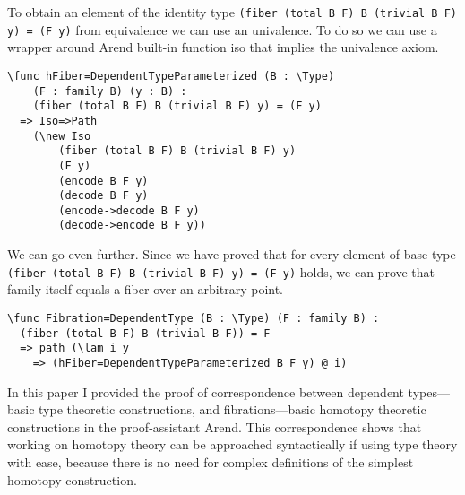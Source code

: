 To obtain an element of the identity type \texttt{(fiber (total B F) B (trivial B F) y) = (F y)} from equivalence we can use an univalence. To do so we can use a wrapper around Arend built-in function iso that implies the univalence axiom.

\begin{ListingEnv}[H]
\begin{lstlisting}
\func hFiber=DependentTypeParameterized (B : \Type) 
	(F : family B) (y : B) : 
	(fiber (total B F) B (trivial B F) y) = (F y)
  => Iso=>Path 
  	(\new Iso 
  		(fiber (total B F) B (trivial B F) y) 
  		(F y) 
  		(encode B F y) 
  		(decode B F y) 
  		(encode->decode B F y) 
  		(decode->encode B F y))
\end{lstlisting}
\end{ListingEnv}

We can go even further. Since we have proved that for every element of base type \texttt{(fiber (total B F) B (trivial B F) y) = (F y)} holds, we can prove that family itself equals a fiber over an arbitrary point.

\begin{ListingEnv}[H]
\begin{lstlisting}
\func Fibration=DependentType (B : \Type) (F : family B) : 
  (fiber (total B F) B (trivial B F)) = F
  => path (\lam i y
    => (hFiber=DependentTypeParameterized B F y) @ i)
\end{lstlisting}
\end{ListingEnv}

\Conc

In this paper I provided the proof of correspondence between dependent types---basic type theoretic constructions, and fibrations---basic homotopy theoretic constructions in the proof-assistant Arend. This correspondence shows that working on homotopy theory can be approached syntactically if using type theory with ease, because there is no need for complex definitions of the simplest homotopy construction.

\begin{otherlanguage}{english}
\printbibliography[
    heading=bibintoc
    ,title=Bibliography
]
\end{otherlanguage}


